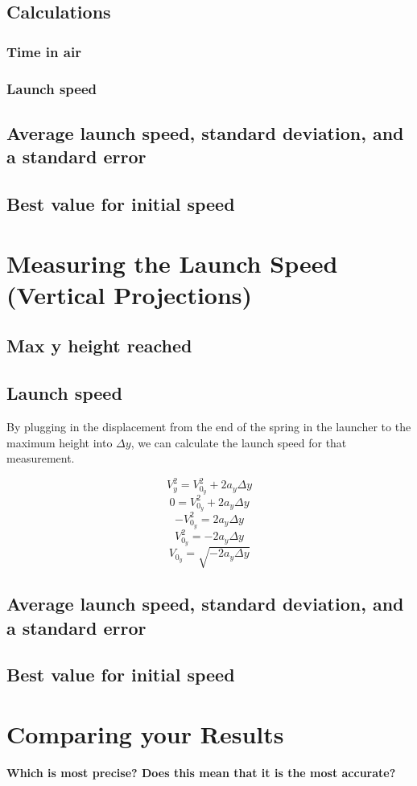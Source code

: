 \documentclass[11pt, letterpaper, includehead]{article}
\begin{document}
\subsection{Calculations} %
\subsubsection{Time in air} %
\subsubsection{Launch speed} %
\subsection{Average launch speed, standard deviation, and a standard error} %
\subsection{Best value for initial speed} %
\section {Measuring the Launch Speed (Vertical Projections)} %
\subsection{Max y height reached} %
\subsection{Launch speed} %
By plugging in the displacement from the end of the spring
in the launcher to the maximum height into $\Delta y$, we
can calculate the launch speed for that measurement.

$$V_y^2 = V_{0_y}^2 + 2a_y\Delta y$$
$$0 = V_{0_y}^2 + 2a_y\Delta y$$
$$-V_{0_y}^2 = 2a_y\Delta y$$
$$V_{0_y}^2 = -2a_y\Delta y$$
$$V_{0_y} = \sqrt{-2a_y\Delta y}$$
\subsection{Average launch speed, standard deviation, and a standard error} %
\subsection{Best value for initial speed} %

\section{Comparing your Results} %
\textbf{Which is most precise? Does this mean that it is the most accurate?}\\ 
\end{document}

